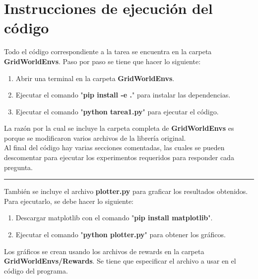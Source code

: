 \documentclass[
	spanish, %
	oneside
]{article}
\begin{document}
\templateFinalcfg


\section*{Instrucciones de ejecución del código}

Todo el código correspondiente a la tarea se encuentra en la carpeta \textbf{GridWorldEnvs}. Paso por paso se tiene que hacer lo siguiente:

\begin{enumerate}
	\item Abrir una terminal en la carpeta \textbf{GridWorldEnvs}.
	\item Ejecutar el comando "\textbf{pip install -e .}" \space para instalar las dependencias.
	\item Ejecutar el comando "\textbf{python tarea1.py}" \space para ejecutar el código.
\end{enumerate}

\noindent La razón por la cual se incluye la carpeta completa de \textbf{GridWorldEnvs} es porque se modificaron varios archivos de la librería original. \\

\noindent Al final del código hay varias secciones comentadas, las cuales se pueden descomentar para ejecutar los experimentos requeridos para responder cada pregunta. \\

\vspace*{12pt}
\hrule height 0.1pt 
\vspace*{20pt}

\noindent También se incluye el archivo \textbf{plotter.py} para graficar los resultados obtenidos. Para ejecutarlo, se debe hacer lo siguiente:

\begin{enumerate}
	\item Descargar matplotlib con el comando "\textbf{pip install matplotlib}".
	\item Ejecutar el comando "\textbf{python plotter.py}" \space para obtener los gráficos.
\end{enumerate}

\noindent Los gráficos se crean usando los archivos de rewards en la carpeta \textbf{GridWorldEnvs/Rewards}. Se tiene que especificar el archivo a usar en el código del programa. \\
\end{document}
